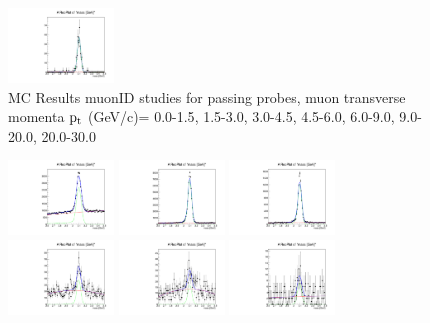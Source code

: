\documentclass{article}
\begin{document}
\begin{figure}
    \includegraphics[width=0.25\textwidth]{../PlotsRooFitMC/croofit_id_pass_6.pdf}
    \caption{MC Results muonID studies for passing probes, muon transverse momenta
    $\rm p_{t}$ (GeV/c)= {0.0-1.5}, {1.5-3.0}, {3.0-4.5}, {4.5-6.0}, 
    {6.0-9.0}, {9.0-20.0}, {20.0-30.0}}
\end{figure}

\begin{figure}
    \includegraphics[width=0.25\textwidth]{../PlotsRooFitMC/croofit_id_fail_0.pdf}
    \includegraphics[width=0.25\textwidth]{../PlotsRooFitMC/croofit_id_fail_1.pdf}
    \includegraphics[width=0.25\textwidth]{../PlotsRooFitMC/croofit_id_fail_2.pdf}
    \includegraphics[width=0.25\textwidth]{../PlotsRooFitMC/croofit_id_fail_3.pdf}
    \includegraphics[width=0.25\textwidth]{../PlotsRooFitMC/croofit_id_fail_4.pdf}
    \includegraphics[width=0.25\textwidth]{../PlotsRooFitMC/croofit_id_fail_5.pdf}

\end{figure}
\end{document}
